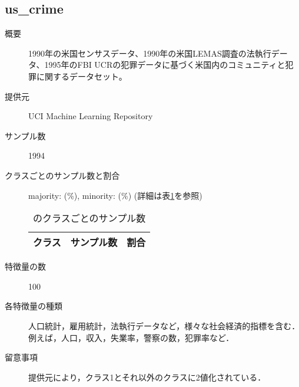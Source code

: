 \subsection{us\_crime}
\begin{description}
    \item[概要] 1990年の米国センサスデータ、1990年の米国LEMAS調査の法執行データ、1995年のFBI UCRの犯罪データに基づく米国内のコミュニティと犯罪に関するデータセット。\cite{us_crime}
    \item[提供元] UCI Machine Learning Repository
    \item[サンプル数] 1994
    \item[クラスごとのサンプル数と割合] majority:  (\%), minority:  (\%) (詳細は表\ref{tab:}を参照)

        \begin{table}
            \centering
            \caption{のクラスごとのサンプル数}
            \label{tab:}
            \begin{tabular}{lrc} \hline
                \multicolumn{1}{c}{クラス}&
                \multicolumn{1}{c}{サンプル数}&
                \multicolumn{1}{c}{割合}\\
                \hline
                \hline

                \hline
            \end{tabular}
        \end{table}

    \item[特徴量の数] 100
    \item[各特徴量の種類] \mbox{}
        人口統計，雇用統計，法執行データなど，様々な社会経済的指標を含む．例えば，人口，収入，失業率，警察の数，犯罪率など．
    \item[留意事項] 提供元により，クラス1とそれ以外のクラスに2値化されている．
\end{description}


